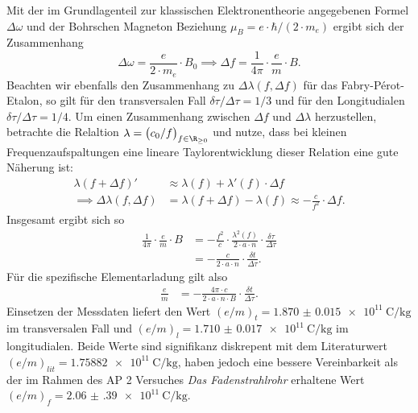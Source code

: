 \documentclass[../main.tex]{subfiles}
\begin{document}
    Mit der im Grundlagenteil zur klassischen Elektronentheorie angegebenen Formel $\Delta\omega$ und der Bohrschen Magneton Beziehung $\mu_B = e\cdot\hbar/(2\cdot m_e)$ ergibt sich der Zusammenhang
    \[
        \Delta\omega = \frac{e}{2\cdot m_e}\cdot B_0 \implies \Delta f=\frac{1}{4\pi}\cdot\frac{e}{m}\cdot B.
    \]
    Beachten wir ebenfalls den Zusammenhang zu $\Delta\lambda(f,\Delta f)$ für das Fabry-Pérot-Etalon, so gilt für den transversalen Fall $\delta\tau/\Delta\tau=1/3$ und für den Longitudialen $\delta\tau/\Delta\tau=1/4$. Um einen Zusammenhang zwischen $\Delta f$ und $\Delta\lambda$ herzustellen, betrachte die Relaltion $\lambda=\big(c_0/f\big)_{f\in\R_{\geq 0}}$ und nutze, dass bei kleinen Frequenzaufspaltungen eine lineare Taylorentwicklung dieser Relation eine gute Näherung ist:
    \begin{align*}
        \lambda(f+\Delta f)' &\approx \lambda(f) + \lambda'(f)\cdot\Delta f\\
        \implies \Delta \lambda(f,\Delta f) &= \lambda(f+\Delta f) - \lambda(f) \approx -\frac{c}{f^2}\cdot\Delta f.
    \end{align*}
    Insgesamt ergibt sich so 
    \begin{align*}
        \frac{1}{4\pi}\cdot\frac{e}{m}\cdot B &= -\frac{f^2}{c}\cdot \frac{\lambda^2(f)}{2\cdot a\cdot n}\cdot\frac{\delta\tau}{\Delta\tau}\\
        &= -\frac{c}{2\cdot a\cdot n}\cdot\frac{\delta t}{\Delta\tau}.
    \end{align*}
    Für die spezifische Elementarladung gilt also
    \begin{align*}
        \frac{e}{m} &= -\frac{4\pi\cdot c}{2\cdot a\cdot n\cdot B}\cdot\frac{\delta t}{\Delta\tau}.
    \end{align*}
    Einsetzen der Messdaten liefert den Wert $(e/m)_t=\SI{1.870(15)e11}{\coulomb\per\kilo\gram}$ im transversalen Fall und $(e/m)_l=\SI{1.710(17)e11}{\coulomb\per\kilo\gram}$ im longitudialen. Beide Werte sind signifikanz diskrepent mit dem Literaturwert $(e/m)_{lit}=\SI{1.75882e11}{\coulomb\per\kilo\gram}$, haben jedoch eine bessere Vereinbarkeit als der im Rahmen des AP 2 Versuches \textit{Das Fadenstrahlrohr} erhaltene Wert $(e/m)_f=\SI{2.06(39)e11}{\coulomb\per\kilo\gram}$.\\
\end{document}
